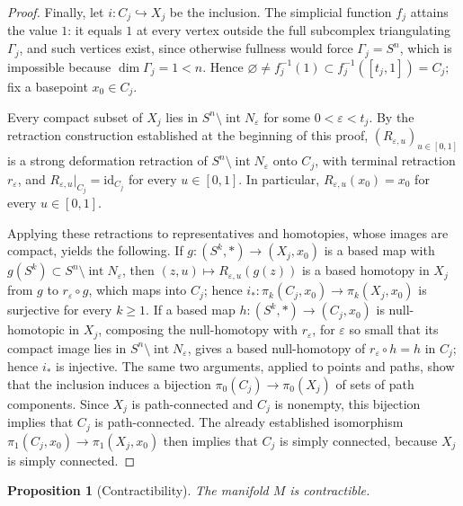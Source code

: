 \documentclass[12pt,oneside,a4paper]{article}
\newtheorem{proposition}[definition]{Proposition}
\theoremstyle{mytheorem}
\theoremstyle{remark}
\theoremstyle{definition}
\begin{document}
\begin{proof}
Finally, let $i:C_j\hookrightarrow X_j$ be the inclusion.  The
simplicial function $f_j$ attains the value $1$: it equals $1$ at
every vertex outside the full subcomplex triangulating $\Gamma_j$, and
such vertices exist, since otherwise fullness would force
$\Gamma_j=S^n$, which is impossible because
$\dim\Gamma_j=1<n$.  Hence
$\varnothing\neq f_j^{-1}(1)\subset f_j^{-1}([t_j,1])=C_j;$
fix a basepoint $x_0\in C_j$.

Every compact subset of $X_j$ lies in
$S^n\setminus\operatorname{int}N_\varepsilon$ for some
$0<\varepsilon<t_j$.  By the retraction construction established at the
beginning of this proof, $(R_{\varepsilon,u})_{u\in[0,1]}$ is a strong
deformation retraction of
$S^n\setminus\operatorname{int}N_\varepsilon$ onto $C_j$, with terminal
retraction $r_\varepsilon$, and
$R_{\varepsilon,u}|_{C_j}=\mathrm{id}_{C_j}$ for every $u\in[0,1]$.
In particular, $R_{\varepsilon,u}(x_0)=x_0$ for every $u\in[0,1]$.

Applying these retractions to representatives and homotopies, whose
images are compact, yields the following.  If
$g:(S^k,*)\to(X_j,x_0)$ is a based map with
$g(S^k)\subset S^n\setminus\operatorname{int}N_\varepsilon$, then
$(z,u)\mapsto R_{\varepsilon,u}(g(z))$ is a based homotopy in $X_j$
from $g$ to $r_\varepsilon\circ g$, which maps into $C_j$; hence
$i_*:\pi_k(C_j,x_0)\to\pi_k(X_j,x_0)$ is surjective for every
$k\geq1$.  If a based map $h:(S^k,*)\to(C_j,x_0)$ is null-homotopic in
$X_j$, composing the null-homotopy with $r_\varepsilon$, for
$\varepsilon$ so small that its compact image lies in
$S^n\setminus\operatorname{int}N_\varepsilon$, gives a based
null-homotopy of $r_\varepsilon\circ h=h$ in $C_j$; hence $i_*$ is
injective.  The same two arguments, applied to points and paths, show
that the inclusion induces a bijection
$\pi_0(C_j)\to\pi_0(X_j)$ of sets of path components.  Since $X_j$ is
path-connected and $C_j$ is nonempty, this bijection implies that
$C_j$ is path-connected.  The already established isomorphism
$\pi_1(C_j,x_0)\to\pi_1(X_j,x_0)$ then implies that $C_j$ is simply
connected, because $X_j$ is simply connected.
\end{proof}




\begin{proposition}[Contractibility]\label{prop:contract}
The manifold $M$ is contractible.
\end{proposition}
\end{document}
